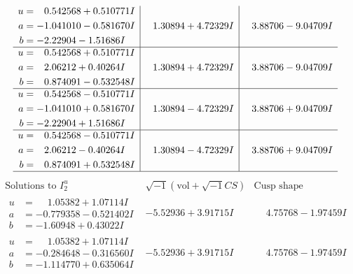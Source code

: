 \documentclass[1p]{elsarticle_modified}
\theoremstyle{definition}
\newcommand{\I}{\sqrt{-1}}
\begin{document}
$$\begin{array}{c|c|c}
\begin{aligned}
u &= \phantom{-}0.542568 + 0.510771 I \\
a &= -1.041010 - 0.581670 I \\
b &= -2.22904 - 1.51686 I\end{aligned}
 & \phantom{-}1.30894 + 4.72329 I & \phantom{-}3.88706 - 9.04709 I \\ \hline\begin{aligned}
u &= \phantom{-}0.542568 + 0.510771 I \\
a &= \phantom{-}2.06212 + 0.40264 I \\
b &= \phantom{-}0.874091 - 0.532548 I\end{aligned}
 & \phantom{-}1.30894 + 4.72329 I & \phantom{-}3.88706 - 9.04709 I \\ \hline\begin{aligned}
u &= \phantom{-}0.542568 - 0.510771 I \\
a &= -1.041010 + 0.581670 I \\
b &= -2.22904 + 1.51686 I\end{aligned}
 & \phantom{-}1.30894 - 4.72329 I & \phantom{-}3.88706 + 9.04709 I \\ \hline\begin{aligned}
u &= \phantom{-}0.542568 - 0.510771 I \\
a &= \phantom{-}2.06212 - 0.40264 I \\
b &= \phantom{-}0.874091 + 0.532548 I\end{aligned}
 & \phantom{-}1.30894 - 4.72329 I & \phantom{-}3.88706 + 9.04709 I\\
 \hline 
 \end{array}$$\newpage$$\begin{array}{c|c|c}  
\text{Solutions to }I^u_{2}& \I (\text{vol} + \sqrt{-1}CS) & \text{Cusp shape}\\
 \hline 
\begin{aligned}
u &= \phantom{-}1.05382 + 1.07114 I \\
a &= -0.779358 - 0.521402 I \\
b &= -1.60948 + 0.43022 I\end{aligned}
 & -5.52936 + 3.91715 I & \phantom{-}4.75768 - 1.97459 I \\ \hline\begin{aligned}
u &= \phantom{-}1.05382 + 1.07114 I \\
a &= -0.284648 - 0.316560 I \\
b &= -1.114770 + 0.635064 I\end{aligned}
 & -5.52936 + 3.91715 I & \phantom{-}4.75768 - 1.97459 I \\ \hline\begin{aligned}

\end{aligned}
\end{array}$$
\end{document}
